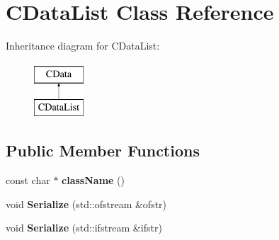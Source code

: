 \hypertarget{classCDataList}{\section{C\-Data\-List Class Reference}
\label{classCDataList}
}
Inheritance diagram for C\-Data\-List\-:\begin{figure}[H]
\begin{center}
\leavevmode
\includegraphics[height=2.000000cm]{classCDataList}
\end{center}
\end{figure}
\subsection*{Public Member Functions}
\begin{DoxyCompactItemize}
\item 
\hypertarget{classCDataList_ab48a0a754f54e65e952c7ca29ee3fd0d}{const char $\ast$ {\bfseries class\-Name} ()}\label{classCDataList_ab48a0a754f54e65e952c7ca29ee3fd0d}

\item 
\hypertarget{classCDataList_a842b7f2e2c6e9ca0ad6112496c4fd609}{void {\bfseries Serialize} (std\-::ofstream \&ofstr)}\label{classCDataList_a842b7f2e2c6e9ca0ad6112496c4fd609}

\item 
\hypertarget{classCDataList_ae54062487688d1050e4b2a88eb564222}{void {\bfseries Serialize} (std\-::ifstream \&ifstr)}\label{classCDataList_ae54062487688d1050e4b2a88eb564222}

\end{DoxyCompactItemize}
